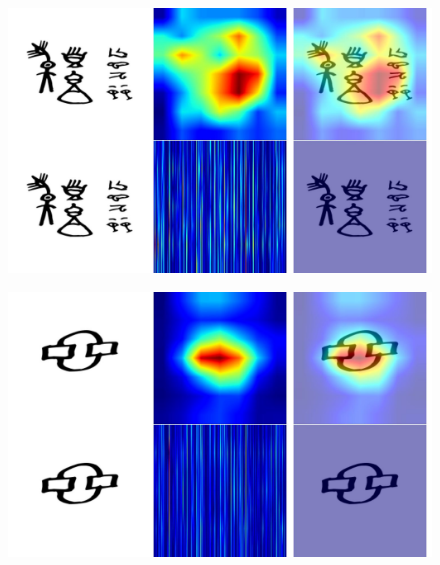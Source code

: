 \documentclass[11pt,a4paper,oneside]{report}
\begin{document}
 \begin{figure}[H]
    \centering
    \includegraphics[width=0.9\linewidth]{Visualizations/Grad-CAM/Naxi-Dongba/gradcam_dongba_E7F4_combined.pdf}
\end{figure}
 \begin{figure}[H]
    \centering
    \includegraphics[width=0.9\linewidth]{Visualizations/Grad-CAM/Naxi-Dongba/gradcam_dongba_E62A_combined.pdf}
\end{figure}
\end{document}
